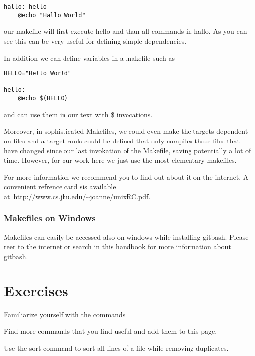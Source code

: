 \begin{lstlisting} 
hallo: hello
    @echo "Hallo World"
\end{lstlisting} 

our makefile will first execute hello and than all commands in hallo.
As you can see this can be very useful for defining simple
dependencies. 

In addition we can define variables in a makefile such as 

\begin{lstlisting} 
HELLO="Hello World"

hello: 
    @echo $(HELLO)
\end{lstlisting} 

and can use them in our text with \$ invocations.

Moreover, in sophisticated Makefiles, we could even make the targets
dependent on files and a target rouls could be defined that only
compiles those files that have changed since our last invokation of
the Makefile, saving potentially a lot of time. However, for our work
here we just use the most elementary makefiles.

For more information we recommend you to find out about it on the internet.
A convenient refrence card sis available at~\url{http://www.cs.jhu.edu/~joanne/unixRC.pdf}.


\subsubsection{Makefiles on Windows}

Makefiles can easily be accessed also on windows while installing
gitbash. Please reer to the internet or search in this handbook for
more information about gitbash.



\section{Exercises}

\begin{exercise}
\label{E:Linux.1}
Familiarize yourself with the commands
\end{exercise}

\begin{exercise}
\label{E:Linux.2}
Find more commands that you find useful and add them to this page.
\end{exercise}

\begin{exercise}
\label{E:Linux.3}
Use the sort command to sort all lines of a file while removing
duplicates.
\end{exercise}

